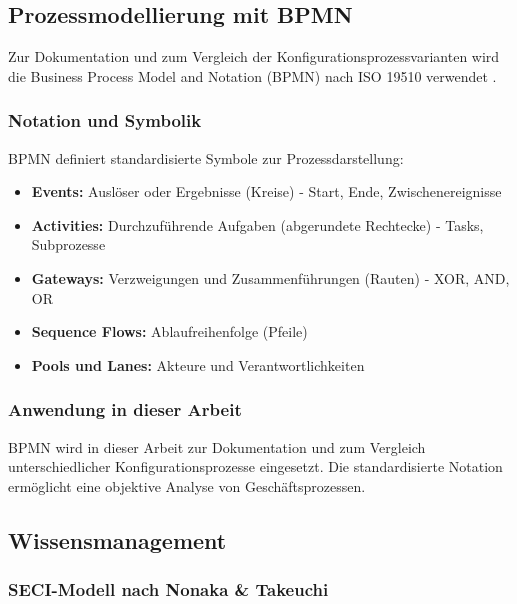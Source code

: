 \subsection{Prozessmodellierung mit BPMN}
\label{subsec:BPMN}

Zur Dokumentation und zum Vergleich der Konfigurationsprozessvarianten wird die Business Process Model and Notation (BPMN) nach ISO 19510 verwendet \citep{ISO19510:2013}.

\subsubsection{Notation und Symbolik}
\label{subsubsec:BPMNNotation}

BPMN definiert standardisierte Symbole zur Prozessdarstellung:

\begin{itemize}
    \item \textbf{Events:} Auslöser oder Ergebnisse (Kreise) - Start, Ende, Zwischenereignisse
    \item \textbf{Activities:} Durchzuführende Aufgaben (abgerundete Rechtecke) - Tasks, Subprozesse
    \item \textbf{Gateways:} Verzweigungen und Zusammenführungen (Rauten) - XOR, AND, OR
    \item \textbf{Sequence Flows:} Ablaufreihenfolge (Pfeile)
    \item \textbf{Pools und Lanes:} Akteure und Verantwortlichkeiten
\end{itemize}

\subsubsection{Anwendung in dieser Arbeit}
\label{subsubsec:BPMNAnwendung}

BPMN wird in dieser Arbeit zur Dokumentation und zum Vergleich unterschiedlicher Konfigurationsprozesse eingesetzt. Die standardisierte Notation ermöglicht eine objektive Analyse von Geschäftsprozessen.


\subsection{Wissensmanagement}
\label{subsec:Wissensmanagement}


\subsubsection{SECI-Modell nach Nonaka \& Takeuchi}
\label{subsubsec:SECIModell}

